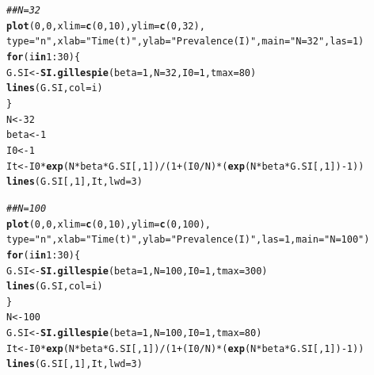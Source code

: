 \documentclass[12pt]{article}\usepackage[]{graphicx}\usepackage[]{color}
\makeatletter
\newcommand{\hlnum}[1]{\textcolor[rgb]{0.686,0.059,0.569}{#1}}%
\newcommand{\hlstr}[1]{\textcolor[rgb]{0.192,0.494,0.8}{#1}}%
\newcommand{\hlcom}[1]{\textcolor[rgb]{0.678,0.584,0.686}{\textit{#1}}}%
\newcommand{\hlopt}[1]{\textcolor[rgb]{0,0,0}{#1}}%
\newcommand{\hlstd}[1]{\textcolor[rgb]{0.345,0.345,0.345}{#1}}%
\newcommand{\hlkwa}[1]{\textcolor[rgb]{0.161,0.373,0.58}{\textbf{#1}}}%
\newcommand{\hlkwb}[1]{\textcolor[rgb]{0.69,0.353,0.396}{#1}}%
\newcommand{\hlkwc}[1]{\textcolor[rgb]{0.333,0.667,0.333}{#1}}%
\newcommand{\hlkwd}[1]{\textcolor[rgb]{0.737,0.353,0.396}{\textbf{#1}}}%
\newenvironment{kframe}{%
 \def\at@end@of@kframe{}%
 \ifinner\ifhmode%
  \def\at@end@of@kframe{\end{minipage}}%
  \begin{minipage}{\columnwidth}%
 \fi\fi%
 \def\FrameCommand##1{\hskip\@totalleftmargin \hskip-\fboxsep
 \colorbox{shadecolor}{##1}\hskip-\fboxsep
     \hskip-\linewidth \hskip-\@totalleftmargin \hskip\columnwidth}%
 \MakeFramed {\advance\hsize-\width
   \@totalleftmargin\z@ \linewidth\hsize
   \@setminipage}}%
 {\par\unskip\endMakeFramed%
 \at@end@of@kframe}
\newenvironment{knitrout}{}{} %
\makeatother
\begin{document}
\begin{enumerate}[(a)]
\begin{knitrout}
\begin{kframe}
\begin{alltt}
\hlcom{## N=32}
\hlkwd{plot}\hlstd{(}\hlnum{0}\hlstd{,}\hlnum{0}\hlstd{,}\hlkwc{xlim}\hlstd{=}\hlkwd{c}\hlstd{(}\hlnum{0}\hlstd{,}\hlnum{10}\hlstd{),}\hlkwc{ylim}\hlstd{=}\hlkwd{c}\hlstd{(}\hlnum{0}\hlstd{,}\hlnum{32}\hlstd{),}
     \hlkwc{type}\hlstd{=}\hlstr{"n"}\hlstd{,}\hlkwc{xlab}\hlstd{=}\hlstr{"Time (t)"}\hlstd{,}\hlkwc{ylab}\hlstd{=}\hlstr{"Prevalence (I)"}\hlstd{,}\hlkwc{main} \hlstd{=} \hlstr{"N = 32"}\hlstd{,} \hlkwc{las}\hlstd{=}\hlnum{1}\hlstd{)}
\hlkwa{for}\hlstd{(i} \hlkwa{in} \hlnum{1}\hlopt{:}\hlnum{30}\hlstd{)\{}
  \hlstd{G.SI} \hlkwb{<-} \hlkwd{SI.gillespie}\hlstd{(}\hlkwc{beta}\hlstd{=}\hlnum{1}\hlstd{,} \hlkwc{N}\hlstd{=}\hlnum{32}\hlstd{,} \hlkwc{I0}\hlstd{=}\hlnum{1}\hlstd{,} \hlkwc{tmax}\hlstd{=}\hlnum{80}\hlstd{)}
  \hlkwd{lines}\hlstd{(G.SI,} \hlkwc{col}\hlstd{=i)}
\hlstd{\}}
\hlstd{N} \hlkwb{<-} \hlnum{32}
\hlstd{beta} \hlkwb{<-} \hlnum{1}
\hlstd{I0} \hlkwb{<-} \hlnum{1}
\hlstd{It} \hlkwb{<-} \hlstd{I0}\hlopt{*}\hlkwd{exp}\hlstd{(N}\hlopt{*}\hlstd{beta}\hlopt{*}\hlstd{G.SI[,}\hlnum{1}\hlstd{])}\hlopt{/}\hlstd{(}\hlnum{1}\hlopt{+}\hlstd{(I0}\hlopt{/}\hlstd{N)}\hlopt{*}\hlstd{(}\hlkwd{exp}\hlstd{(N}\hlopt{*}\hlstd{beta}\hlopt{*}\hlstd{G.SI[,}\hlnum{1}\hlstd{])}\hlopt{-}\hlnum{1}\hlstd{))}
\hlkwd{lines}\hlstd{(G.SI[,}\hlnum{1}\hlstd{],It,}\hlkwc{lwd}\hlstd{=}\hlnum{3}\hlstd{)}

\hlcom{## N=100}
\hlkwd{plot}\hlstd{(}\hlnum{0}\hlstd{,}\hlnum{0}\hlstd{,}\hlkwc{xlim}\hlstd{=}\hlkwd{c}\hlstd{(}\hlnum{0}\hlstd{,}\hlnum{10}\hlstd{),}\hlkwc{ylim}\hlstd{=}\hlkwd{c}\hlstd{(}\hlnum{0}\hlstd{,}\hlnum{100}\hlstd{),}
     \hlkwc{type}\hlstd{=}\hlstr{"n"}\hlstd{,}\hlkwc{xlab}\hlstd{=}\hlstr{"Time (t)"}\hlstd{,}\hlkwc{ylab}\hlstd{=}\hlstr{"Prevalence (I)"}\hlstd{,}\hlkwc{las}\hlstd{=}\hlnum{1}\hlstd{,} \hlkwc{main} \hlstd{=} \hlstr{"N = 100"}\hlstd{)}
\hlkwa{for}\hlstd{(i} \hlkwa{in} \hlnum{1}\hlopt{:}\hlnum{30}\hlstd{)\{}
  \hlstd{G.SI} \hlkwb{<-} \hlkwd{SI.gillespie}\hlstd{(}\hlkwc{beta}\hlstd{=}\hlnum{1}\hlstd{,} \hlkwc{N}\hlstd{=}\hlnum{100}\hlstd{,} \hlkwc{I0}\hlstd{=}\hlnum{1}\hlstd{,} \hlkwc{tmax}\hlstd{=}\hlnum{300}\hlstd{)}
  \hlkwd{lines}\hlstd{(G.SI,} \hlkwc{col}\hlstd{=i)}
\hlstd{\}}
\hlstd{N} \hlkwb{<-} \hlnum{100}
\hlstd{G.SI} \hlkwb{<-} \hlkwd{SI.gillespie}\hlstd{(}\hlkwc{beta}\hlstd{=}\hlnum{1}\hlstd{,} \hlkwc{N}\hlstd{=}\hlnum{100}\hlstd{,} \hlkwc{I0}\hlstd{=}\hlnum{1}\hlstd{,} \hlkwc{tmax}\hlstd{=}\hlnum{80}\hlstd{)}
\hlstd{It} \hlkwb{<-} \hlstd{I0}\hlopt{*}\hlkwd{exp}\hlstd{(N}\hlopt{*}\hlstd{beta}\hlopt{*}\hlstd{G.SI[,}\hlnum{1}\hlstd{])}\hlopt{/}\hlstd{(}\hlnum{1}\hlopt{+}\hlstd{(I0}\hlopt{/}\hlstd{N)}\hlopt{*}\hlstd{(}\hlkwd{exp}\hlstd{(N}\hlopt{*}\hlstd{beta}\hlopt{*}\hlstd{G.SI[,}\hlnum{1}\hlstd{])}\hlopt{-}\hlnum{1}\hlstd{))}
\hlkwd{lines}\hlstd{(G.SI[,}\hlnum{1}\hlstd{],It,}\hlkwc{lwd}\hlstd{=}\hlnum{3}\hlstd{)}


\end{alltt}
\end{kframe}
\end{knitrout}
\end{enumerate}
\end{document}

